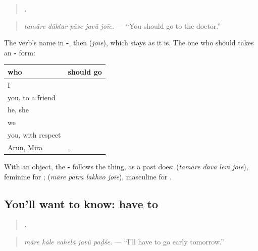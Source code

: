\begin{grammarlens}[title={Grammar Lens: the one who should takes -\gu{એ}}]
\begin{quote}
\textbf{    .}
\end{quote}

\begin{quote}
\emph{tamāre dāktar pāse javũ joīe.} — \textquotedblleft{}You should go to the doctor.\textquotedblright{}
\end{quote}

The verb's name in \textbf{-}, then \textbf{} (\emph{joīe}), which stays as it is. The one who should takes an \textbf{-} form:

\noindent
\begin{tabularx}{\linewidth}{@{}>{\raggedright\arraybackslash}X>{\raggedright\arraybackslash}X@{}}
\toprule
\textbf{who} & \textbf{should go} \\
\midrule
I & \textbf{\gu{મારે} \gu{જવું} \gu{જોઈએ}} \\
you, to a friend & \textbf{\gu{તારે} \gu{જવું} \gu{જોઈએ}} \\
he, she & \textbf{\gu{તેણે} \gu{જવું} \gu{જોઈએ}} \\
we & \textbf{\gu{અમારે} \gu{જવું} \gu{જોઈએ}} \\
you, with respect & \textbf{\gu{તમારે} \gu{જવું} \gu{જોઈએ}} \\
Arun, Mira & \textbf{\gu{અરુણે}}, \textbf{\gu{મીરાએ}} \\
\bottomrule
\end{tabularx}

With an object, the \textbf{-} follows the thing, as a past does: \textbf{   } (\emph{tamāre davā levī joīe}), feminine for \textbf{}; \textbf{   } (\emph{māre patra lakhvo joīe}), masculine for \textbf{}.
\end{grammarlens}

\subsection*{You'll want to know: have to}
\begin{quote}
\textbf{    .}
\end{quote}

\begin{quote}
\emph{māre kāle vahelā javũ paḍśe.} — \textquotedblleft{}I'll have to go early tomorrow.\textquotedblright{}
\end{quote}

